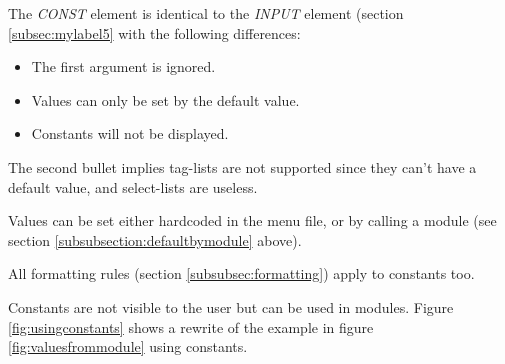 \documentclass[a4paper]{book}
\newcommand{\vs}{\vspace{3mm}}
\begin{document}
The \textsl{CONST} element is identical to the \textsl{INPUT} element (section \ref{subsec:mylabel5}  with the following differences:

\begin{itemize}
\item The first argument is ignored.
\item Values can only be set by the default value.
\item Constants will not be displayed.
\end{itemize}

The second bullet implies tag-lists are not supported since they can't have a default value, and select-lists are useless.

Values can be set either hardcoded in the menu file, or by calling a module (see section \ref{subsubsection:defaultbymodule} above).

All formatting rules (section \ref{subsubsec:formatting}) apply to constants too.

\vs

Constants are not visible to the user but can be used in modules.
Figure \ref{fig:usingconstants} shows a rewrite of the example in figure \ref{fig:valuesfrommodule} using constants.
\end{document}
